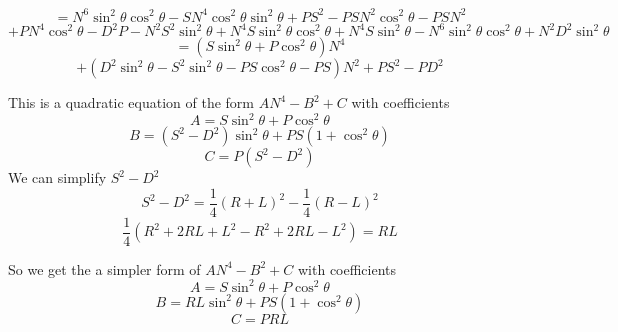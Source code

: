 \begin{equation*}
	= N^6 \sin^2 \theta \cos^2 \theta - SN^4 \cos^2 \theta \sin^2 \theta + PS^2 - PSN^2 \cos^2 \theta - PSN^2
\end{equation*}
\begin{equation*}
	 + PN^4 \cos^2 \theta - D^2P - N^2S^2 \sin^2 \theta + N^4S \sin^2 \theta \cos^2 \theta + N^4 S \sin^2 \theta - N^6 \sin^2 \theta \cos^2 \theta + N^2 D^2 \sin^2 \theta
\end{equation*}
\begin{equation*}
	= \left( S \sin^2 \theta + P \cos^2 \theta \right)N^4
\end{equation*}
\begin{equation*}
	+ \left( D^2 \sin^2 \theta - S^2 \sin^2 \theta - PS \cos^2 \theta - PS \right)N^2 + PS^2 - PD^2
\end{equation*}

This is a quadratic equation of the form $AN^4 - B^2 + C$ with coefficients
\begin{equation}
	A = S \sin^2 \theta + P \cos^2 \theta
\end{equation}
\begin{equation}
	B = \left(S^2 - D^2\right) \sin^2 \theta + PS \left(1 + \cos^2 \theta\right)
\end{equation}
\begin{equation}
	C = P \left( S^2 - D^2 \right)
\end{equation}
We can simplify $S^2 - D^2$
\begin{equation*}
	S^2 - D^2 = \frac{1}{4} \left( R + L \right)^2 - \frac{1}{4} \left( R - L \right)^2
\end{equation*}
\begin{equation}
	\frac{1}{4} \left( R^2 + 2RL + L^2 - R^2 + 2RL - L^2 \right) = RL
\end{equation}

So we get the a simpler form of $AN^4 - B^2 + C$ with coefficients
\begin{equation}
	A = S \sin^2 \theta + P \cos^2 \theta
\end{equation}
\begin{equation}
	B = RL \sin^2 \theta + PS \left(1 + \cos^2 \theta\right)
\end{equation}
\begin{equation}
	C = PRL
\end{equation}

